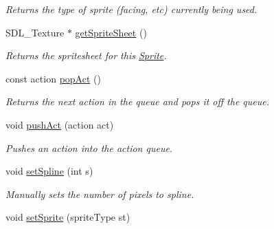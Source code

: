 \begin{DoxyCompactItemize}
\begin{DoxyCompactList}\small\item\em Returns the type of sprite (facing, etc) currently being used. \end{DoxyCompactList}\item 
S\+D\+L\+\_\+\+Texture $\ast$ \hyperlink{class_sprite_abec247d2cd9396834344c3cfe81eddc1}{get\+Sprite\+Sheet} ()\hypertarget{class_sprite_abec247d2cd9396834344c3cfe81eddc1}{}\label{class_sprite_abec247d2cd9396834344c3cfe81eddc1}

\begin{DoxyCompactList}\small\item\em Returns the spritesheet for this \hyperlink{class_sprite}{Sprite}. \end{DoxyCompactList}\item 
const action \hyperlink{class_sprite_a1b5ac18ba8c0a4e4245d1ed49b9a48aa}{pop\+Act} ()\hypertarget{class_sprite_a1b5ac18ba8c0a4e4245d1ed49b9a48aa}{}\label{class_sprite_a1b5ac18ba8c0a4e4245d1ed49b9a48aa}

\begin{DoxyCompactList}\small\item\em Returns the next action in the queue and pops it off the queue. \end{DoxyCompactList}\item 
void \hyperlink{class_sprite_a25d3b1c4533e8aa9e530d7025dc5365b}{push\+Act} (action act)\hypertarget{class_sprite_a25d3b1c4533e8aa9e530d7025dc5365b}{}\label{class_sprite_a25d3b1c4533e8aa9e530d7025dc5365b}

\begin{DoxyCompactList}\small\item\em Pushes an action into the action queue. \end{DoxyCompactList}\item 
void \hyperlink{class_sprite_a1ce4def2f83442fd086e38568f93c6cd}{set\+Spline} (int s)\hypertarget{class_sprite_a1ce4def2f83442fd086e38568f93c6cd}{}\label{class_sprite_a1ce4def2f83442fd086e38568f93c6cd}

\begin{DoxyCompactList}\small\item\em Manually sets the number of pixels to spline. \end{DoxyCompactList}\item 
void \hyperlink{class_sprite_aa9d0dd6123988d79c94a18f3e404d8d7}{set\+Sprite} (sprite\+Type st)\hypertarget{class_sprite_aa9d0dd6123988d79c94a18f3e404d8d7}{}\label{class_sprite_aa9d0dd6123988d79c94a18f3e404d8d7}


\end{DoxyCompactItemize}

